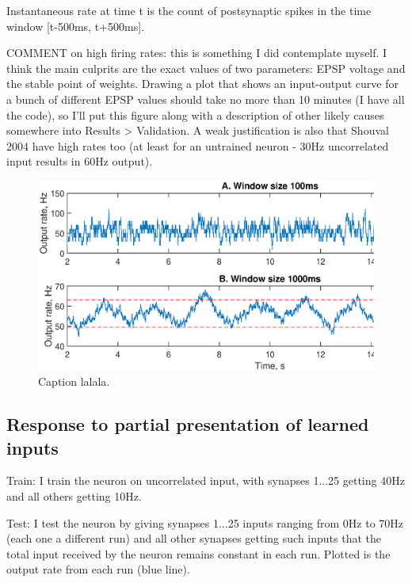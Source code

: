 \documentclass[a4paper,12pt]{report}
\theoremstyle{definition}
\begin{document}
Instantaneous rate at time t is the count of postsynaptic spikes in the time window [t-500ms, t+500ms].

COMMENT on high firing rates: this is something I did contemplate myself. I think the main culprits are the exact values of two parameters: EPSP voltage and the stable point of weights. Drawing a plot that shows an input-output curve for a bunch of different EPSP values should take no more than 10 minutes (I have all the code), so I'll put this figure along with a description of other likely causes somewhere into Results > Validation. A weak justification is also that Shouval 2004 have high rates too (at least for an untrained neuron - 30Hz uncorrelated input results in 60Hz output).


\begin{figure}[h]
    \includegraphics[width=\textwidth]{figures/exp6_voltageoscillation.eps}
    \caption{Caption lalala.}
    \label{fig:exp6voltageoscillation}
\end{figure}







\clearpage %
\subsection{Response to partial presentation of learned inputs}

Train: I train the neuron on uncorrelated input, with synapses 1...25 getting 40Hz and all others getting 10Hz.

Test: I test the neuron by giving synapses 1...25 inputs ranging from 0Hz to 70Hz (each one a different run) and all other synapses getting such inputs that the total input received by the neuron remains constant in each run. Plotted is the output rate from each run (blue line).
\end{document}

